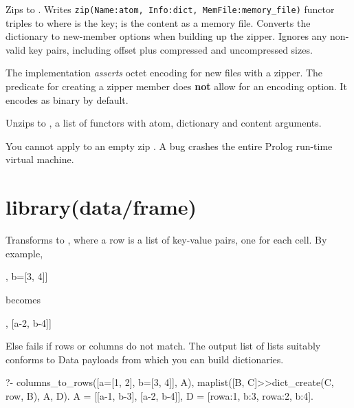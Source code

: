 \begin{description}
Zips  to . Writes \verb$zip(Name:atom, Info:dict, MemFile:memory_file)$ functor triples to  where  is the
key;  is the content as a memory file. Converts the 
dictionary to new-member options when building up the zipper.
Ignores any non-valid key pairs, including offset plus compressed
and uncompressed sizes.

The implementation \textit{asserts} octet encoding for new files with a
zipper. The predicate for creating a zipper member does \textbf{not} allow
for an encoding option. It encodes as binary by default.

Unzips  to , a list of  functors with  atom,
 dictionary and  content arguments.

You cannot apply  to an empty zip . A bug crashes the
entire Prolog run-time virtual machine.
\end{description}

\chapter{library(data/frame)}\label{sec:frame}

\begin{description}
Transforms  to , where a row is a list of
key-value pairs, one for each cell. By example,

\begin{code}
[a=[1, 2], b=[3, 4]]
\end{code}

becomes

\begin{code}
[[a-1, b-3], [a-2, b-4]]
\end{code}

Else fails if rows or columns do not match. The output list of lists
suitably conforms to  Data payloads from which you can
build dictionaries.

\begin{code}
?- columns_to_rows([a=[1, 2], b=[3, 4]], A),
   maplist([B, C]>>dict_create(C, row, B), A, D).
A = [[a-1, b-3], [a-2, b-4]],
D = [row{a:1, b:3}, row{a:2, b:4}].
\end{code}

\end{description}

